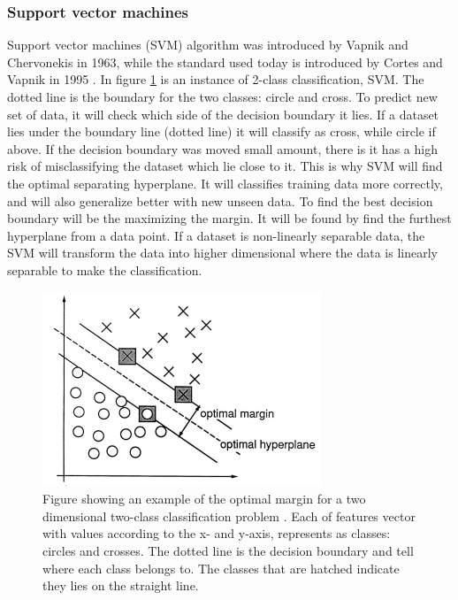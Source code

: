 \documentclass[USenglish]{ifimaster}  %
\begin{document}
\subsubsection{Support vector machines}
Support vector machines (SVM) algorithm was introduced by Vapnik and Chervonekis in 1963, while the standard used today is introduced by Cortes and Vapnik in 1995 \cite{Cortes1995}. In figure \ref{fig:SVM} is an instance of 2-class classification, SVM. The dotted line is the boundary for the two classes: circle and cross. To predict new set of data, it will check which side of the decision boundary it lies. If a dataset lies under the boundary line (dotted line) it will classify as cross, while circle if above. If the decision boundary was moved small amount, there is it has a high risk of misclassifying the dataset which lie close to it. This is why SVM will find the optimal separating hyperplane. It will classifies training data more correctly, and will also generalize better with new unseen data. To find the best decision boundary will be the maximizing the margin. It will be found by find the furthest hyperplane from a data point. If a dataset is non-linearly separable data, the SVM will transform the data into higher dimensional where the data is linearly separable to make the classification.
	
	
	\begin{figure}[h]
		\centering
		\includegraphics{Figures/SVM.PNG}
		\caption{Figure showing an example of the optimal margin for a two dimensional
			two-class classification problem \cite{Cortes1995}. Each of features vector with values according to the x- and y-axis, represents as classes: circles and crosses. The dotted line is the decision boundary and tell where each class belongs to. The classes that are hatched indicate they lies on the straight line. }
		\label{fig:SVM}
	\end{figure}
	
\end{document}
